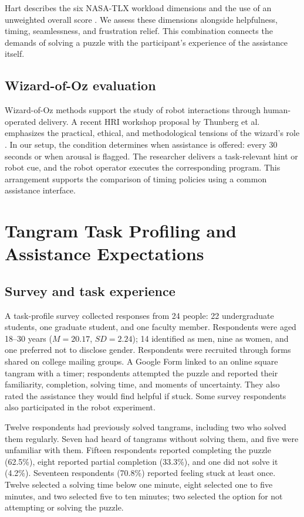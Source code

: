 \documentclass[sigconf,anonymous]{aamas}
\begin{document}
Hart describes the six NASA-TLX workload dimensions and the use of an unweighted overall score \cite{hart2006}. We assess these dimensions alongside helpfulness, timing, seamlessness, and frustration relief. This combination connects the demands of solving a puzzle with the participant's experience of the assistance itself.

\subsection{Wizard-of-Oz evaluation}

Wizard-of-Oz methods support the study of robot interactions through human-operated delivery. A recent HRI workshop proposal by Thunberg et al. emphasizes the practical, ethical, and methodological tensions of the wizard's role \cite{thunberg2026}. In our setup, the condition determines when assistance is offered: every 30 seconds or when arousal is flagged. The researcher delivers a task-relevant hint or robot cue, and the robot operator executes the corresponding program. This arrangement supports the comparison of timing policies using a common assistance interface.

\section{Tangram Task Profiling and Assistance Expectations}

\subsection{Survey and task experience}

A task-profile survey collected responses from 24 people: 22 undergraduate students, one graduate student, and one faculty member. Respondents were aged 18--30 years ($M=20.17$, $SD=2.24$); 14 identified as men, nine as women, and one preferred not to disclose gender. Respondents were recruited through forms shared on college mailing groups. A Google Form linked to an online square tangram with a timer; respondents attempted the puzzle and reported their familiarity, completion, solving time, and moments of uncertainty. They also rated the assistance they would find helpful if stuck. Some survey respondents also participated in the robot experiment.

Twelve respondents had previously solved tangrams, including two who solved them regularly. Seven had heard of tangrams without solving them, and five were unfamiliar with them. Fifteen respondents reported completing the puzzle (62.5\%), eight reported partial completion (33.3\%), and one did not solve it (4.2\%). Seventeen respondents (70.8\%) reported feeling stuck at least once. Twelve selected a solving time below one minute, eight selected one to five minutes, and two selected five to ten minutes; two selected the option for not attempting or solving the puzzle.
\end{document}
